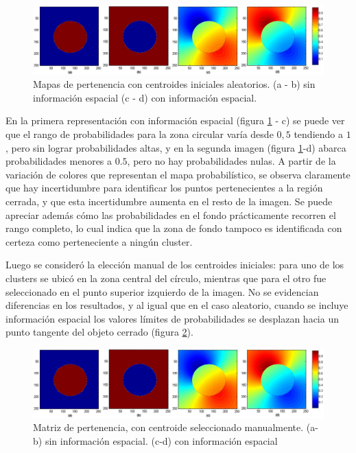 \begin{figure}[h]
\centering
\includegraphics[scale=0.08]{images/circulo-001.jpg}
\caption{Mapas de pertenencia con centroides iniciales aleatorios. (a - b)  sin información espacial (c - d) con información espacial.}
\label{fig:circulo_aleatorio}
\end{figure}

En la primera representación con información espacial (figura \ref{fig:circulo_aleatorio} - c) se puede ver que el rango de probabilidades para la zona circular varía desde $0,5$ tendiendo a $1$, pero sin lograr probabilidades altas, y en la segunda imagen (figura \ref{fig:circulo_aleatorio}-d) abarca probabilidades menores a $0.5$, pero no hay probabilidades nulas. A partir de la variación de colores que representan el mapa probabilístico, se observa claramente que hay incertidumbre para identificar los puntos pertenecientes a la región cerrada, y que esta incertidumbre aumenta en el resto de la imagen. Se puede apreciar además cómo las probabilidades en el fondo prácticamente recorren el rango completo, lo cual indica que la zona de fondo tampoco  es identificada con certeza como perteneciente a ningún cluster.

Luego se consideró la elección manual de los centroides iniciales: para uno de los clusters se ubicó en la zona central del círculo, mientras que para el otro fue seleccionado en el punto superior izquierdo de la imagen. No se evidencian diferencias en los resultados, y al igual que en el caso aleatorio, cuando se incluye información espacial los valores límites de probabilidades se desplazan hacia un punto tangente del objeto cerrado (figura \ref{fig:circulo_aleatorio_centr_manual}).

\begin{figure}[h]
\centering
\includegraphics[scale=0.08]{images/circulo-001.jpg}
\caption{Matriz de pertenencia, con centroide seleccionado manualmente. (a-b) sin información espacial. (c-d) con información espacial}
\label{fig:circulo_aleatorio_centr_manual}
\end{figure}

